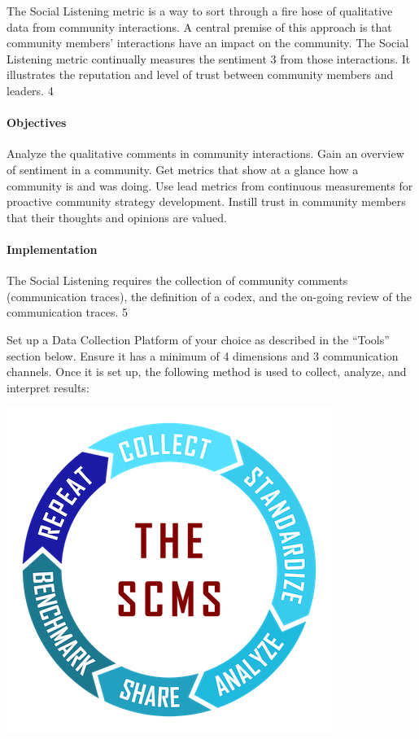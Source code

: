 The Social Listening metric is a way to sort through a fire hose of
qualitative data from community interactions. A central premise of this
approach is that community members' interactions have an impact on the
community. The Social Listening metric continually measures the
sentiment 3 from those interactions. It illustrates the reputation and
level of trust between community members and leaders. 4

\hypertarget{objectives}{%
\paragraph{Objectives}\label{objectives}}

Analyze the qualitative comments in community interactions. Gain an
overview of sentiment in a community. Get metrics that show at a glance
how a community is and was doing. Use lead metrics from continuous
measurements for proactive community strategy development. Instill trust
in community members that their thoughts and opinions are valued.

\hypertarget{implementation}{%
\paragraph{Implementation}\label{implementation}}

The Social Listening requires the collection of community comments
(communication traces), the definition of a codex, and the on-going
review of the communication traces. 5

Set up a Data Collection Platform of your choice as described in the
``Tools'' section below. Ensure it has a minimum of 4 dimensions and 3
communication channels. Once it is set up, the following method is used
to collect, analyze, and interpret results:

\includegraphics{images/social-listening_circle2.png}


